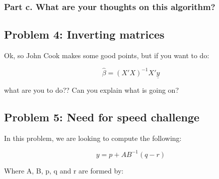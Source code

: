 \documentclass[]{article}
\begin{document}
\hypertarget{part-c.-what-are-your-thoughts-on-this-algorithm}{%
\subsubsection{Part c. What are your thoughts on this
algorithm?}\label{part-c.-what-are-your-thoughts-on-this-algorithm}}

\hypertarget{problem-4-inverting-matrices}{%
\subsection{Problem 4: Inverting
matrices}\label{problem-4-inverting-matrices}}

Ok, so John Cook makes some good points, but if you want to do:

\begin{equation*}
\hat\beta = (X'X)^{-1}X'\underline{y}
\end{equation*}

what are you to do?? Can you explain what is going on?

\hypertarget{problem-5-need-for-speed-challenge}{%
\subsection{Problem 5: Need for speed
challenge}\label{problem-5-need-for-speed-challenge}}

In this problem, we are looking to compute the following:

\begin{equation}
y = p + A B^{-1} (q - r)
\end{equation}

Where A, B, p, q and r are formed by:
\end{document}
